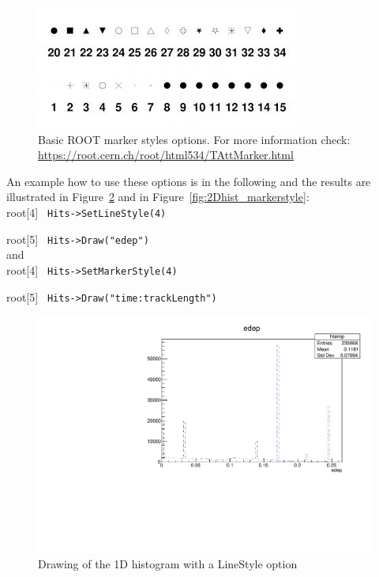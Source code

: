 \documentclass[12pt]{article}
\begin{document}
\begin{figure}[h]
\centering
\includegraphics[scale=0.5]{figs/root_markerstyles.jpeg}
\caption{Basic ROOT marker styles options. For more information check: \href{https://root.cern.ch/root/html534/TAttMarker.html}{https://root.cern.ch/root/html534/TAttMarker.html}}
\label{fig:root_markerstyles}
\end{figure}

An example how to use these options is in the following and the results are illustrated in Figure~\ref{fig:1Dhist_linestyle} and in Figure~\ref{fig:2Dhist_markerstyle}:\\

root[4] \verb| Hits->SetLineStyle(4) |

root[5] \verb| Hits->Draw("edep") | \\

and \\

root[4] \verb| Hits->SetMarkerStyle(4) |

root[5] \verb| Hits->Draw("time:trackLength") | \\

\begin{figure}[h]
\centering
\includegraphics[scale=0.5]{figs/1Dhist_linestyle.pdf}
\caption{Drawing of the 1D histogram with a LineStyle option}
\label{fig:1Dhist_linestyle}
\end{figure}
\end{document}
